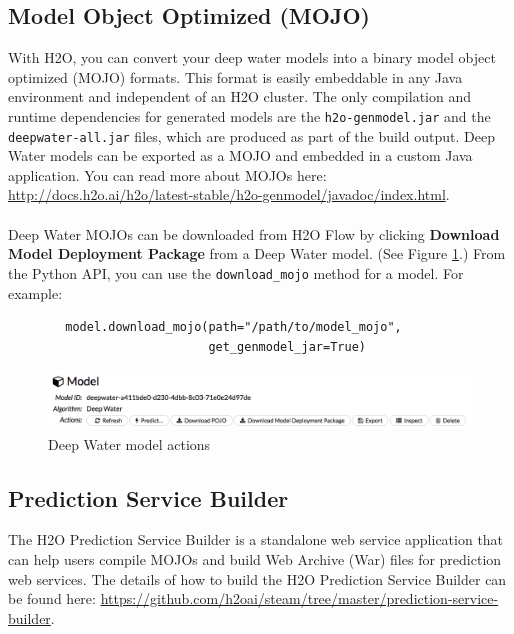 	\subsection{Model Object Optimized (MOJO)}
		With H2O, you can convert your deep water models into a binary model object optimized (MOJO) formats. This format is easily embeddable in any Java environment and independent of an H2O cluster.  The only compilation and runtime dependencies for generated models are the \texttt{h2o-genmodel.jar} and the \texttt{deepwater-all.jar} files, which are produced as part of the build output.  Deep Water models can be exported as a MOJO and embedded in a custom Java application.  You can read more about MOJOs here: {\url{http://docs.h2o.ai/h2o/latest-stable/h2o-genmodel/javadoc/index.html}}.\\
		\\
		Deep Water MOJOs can be downloaded from H2O Flow by clicking \textbf{Download Model Deployment Package} from a Deep Water model. (See Figure \ref{fig:flow-mojo}.)  From the Python API, you can use the \texttt{download\_mojo} method for a model.  For example: 
		
		\begin{verbatim}
		model.download_mojo(path="/path/to/model_mojo", 
		                    get_genmodel_jar=True)
		\end{verbatim}
		
		\begin{figure}[H]
		\begin{center}
			\includegraphics[width=\textwidth]{images/flow-mojo.png}
			\caption{Deep Water model actions}\label{fig:flow-mojo}
		\end{center}
		\end{figure}

	\subsection{Prediction Service Builder}
		The H2O Prediction Service Builder is a standalone web service application that can help users compile MOJOs and build Web Archive (War) files for prediction web services.  The details of how to build the H2O Prediction Service Builder can be found here:  {\url{https://github.com/h2oai/steam/tree/master/prediction-service-builder}}.
		
